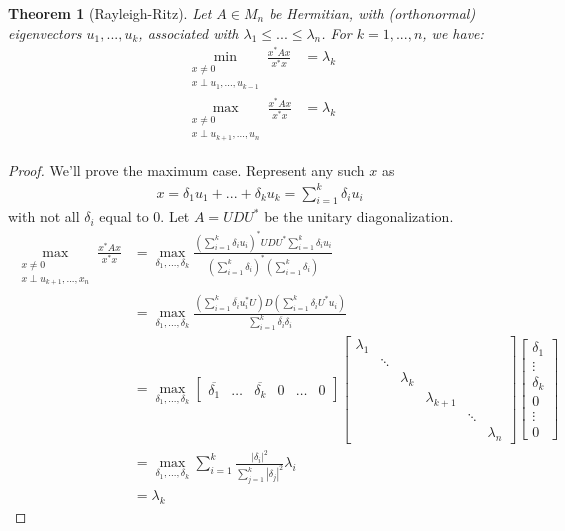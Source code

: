 \documentclass[11pt]{article}
\theoremstyle{plain}
\newtheorem{thm}{Theorem}[section]
\theoremstyle{definition}
\theoremstyle{remark}
\begin{document}
\begin{thm}[Rayleigh-Ritz]
    Let $A \in M_n$ be Hermitian, with (orthonormal) eigenvectors $u_1, ..., u_k$, associated with $\lambda_1 \leq ... \leq \lambda_n$. For $k = 1, ..., n$, we have:
    \begin{align*}
        \min_{\substack{x \neq 0 \\ x \perp u_1 ,..., u_{k-1}}} \frac{x^* A x}{x^* x} &= \lambda_k\\
        \max_{\substack{x \neq 0 \\ x \perp u_{k+1} ,..., u_n}} \frac{x^* A x}{x^* x} &= \lambda_k
    \end{align*}
\end{thm}
\begin{proof}
    We'll prove the maximum case. Represent any such $x$ as
    \begin{align*}
        x = \delta_{1} u_{1} + ... + \delta_k u_k = \sum_{i=1}^k \delta_i u_i
    \end{align*}
    with not all $\delta_i$ equal to 0. Let $A = UDU^*$ be the unitary diagonalization.
    \begin{align*}
        \max_{\substack{x \neq 0 \\ x \perp u_{k+1} ,..., x_n}} \frac{x^* A x}{x^* x} &= \max_{\delta_1, ..., \delta_k} \frac{(\sum_{i=1}^k \delta_i u_i)^* U D U^* \sum_{i=1}^k \delta_i u_i}{(\sum_{i=1}^k \delta_i)^* (\sum_{i=1}^k \delta_i)}\\
        &= \max_{\delta_1, ..., \delta_k} \frac{(\sum_{i=1}^k \overline{\delta_i} u_i^* U) D (\sum_{i=1}^k \delta_i U^* u_i)}{\sum_{i=1}^k \overline{\delta_i} \delta_i}\\
        &= \max_{\delta_1, ..., \delta_k}
        \begin{bmatrix}
            \overline{\delta_1} & \ldots & \overline{\delta_k} & 0 & \ldots & 0
        \end{bmatrix}
        \begin{bmatrix}
            \lambda_1 & & & & &\\
            & \ddots & & & &\\
            & & \lambda_k & & &\\
            & & & \lambda_{k+1} & &\\
            & & & & \ddots &\\
            & & & & & \lambda_n
        \end{bmatrix}
        \begin{bmatrix}
            \delta_1 \\ \vdots \\ \delta_k \\ 0 \\ \vdots \\ 0
        \end{bmatrix}\\
        &= \max_{\delta_1, ..., \delta_k} \sum_{i=1}^k \frac{|\delta_i|^2}{\sum_{j=1}^k |\delta_j|^2} \lambda_i\\
        &= \lambda_k
    \end{align*}
\end{proof}
\end{document}
